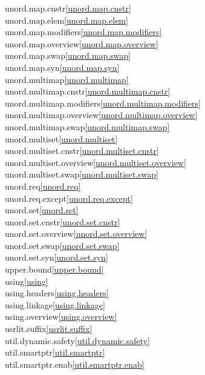 \begin{multicols}{2}
unord.map.cnstr\quad\ref{unord.map.cnstr}\\
unord.map.elem\quad\ref{unord.map.elem}\\
unord.map.modifiers\quad\ref{unord.map.modifiers}\\
unord.map.overview\quad\ref{unord.map.overview}\\
unord.map.swap\quad\ref{unord.map.swap}\\
unord.map.syn\quad\ref{unord.map.syn}\\
unord.multimap\quad\ref{unord.multimap}\\
unord.multimap.cnstr\quad\ref{unord.multimap.cnstr}\\
unord.multimap.modifiers\quad\ref{unord.multimap.modifiers}\\
unord.multimap.overview\quad\ref{unord.multimap.overview}\\
unord.multimap.swap\quad\ref{unord.multimap.swap}\\
unord.multiset\quad\ref{unord.multiset}\\
unord.multiset.cnstr\quad\ref{unord.multiset.cnstr}\\
unord.multiset.overview\quad\ref{unord.multiset.overview}\\
unord.multiset.swap\quad\ref{unord.multiset.swap}\\
unord.req\quad\ref{unord.req}\\
unord.req.except\quad\ref{unord.req.except}\\
unord.set\quad\ref{unord.set}\\
unord.set.cnstr\quad\ref{unord.set.cnstr}\\
unord.set.overview\quad\ref{unord.set.overview}\\
unord.set.swap\quad\ref{unord.set.swap}\\
unord.set.syn\quad\ref{unord.set.syn}\\
upper.bound\quad\ref{upper.bound}\\
using\quad\ref{using}\\
using.headers\quad\ref{using.headers}\\
using.linkage\quad\ref{using.linkage}\\
using.overview\quad\ref{using.overview}\\
usrlit.suffix\quad\ref{usrlit.suffix}\\
util.dynamic.safety\quad\ref{util.dynamic.safety}\\
util.smartptr\quad\ref{util.smartptr}\\
util.smartptr.enab\quad\ref{util.smartptr.enab}\\

\end{multicols}
